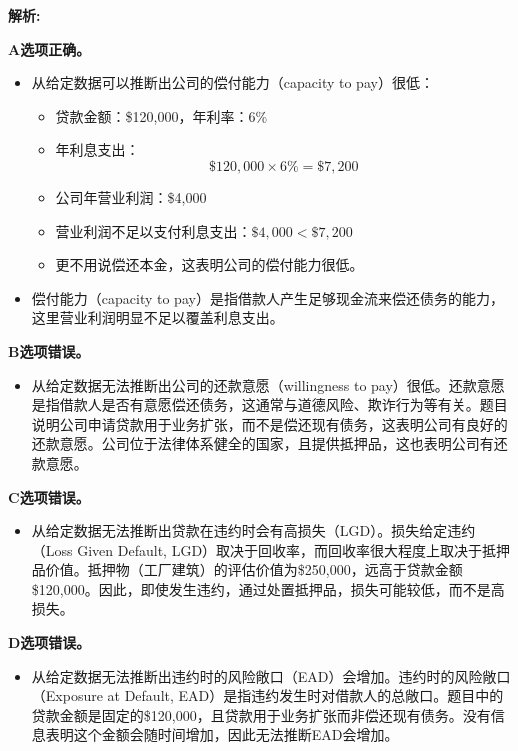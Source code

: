 \documentclass{article}
\newenvironment{explanation}
{\textbf{解析:}\par}
{\par}
\begin{document}
\begin{explanation}

    \textbf{A选项正确。}
    \begin{itemize}
        \item 从给定数据可以推断出公司的偿付能力（capacity to pay）很低：
        \begin{itemize}
            \item 贷款金额：\$120,000，年利率：6\%
            \item 年利息支出：
            \[
            \$120,000 \times 6\% = \$7,200
            \]
            \item 公司年营业利润：\$4,000
            \item 营业利润不足以支付利息支出：$\$4,000 < \$7,200$
            \item 更不用说偿还本金，这表明公司的偿付能力很低。
        \end{itemize}
        \item 偿付能力（capacity to pay）是指借款人产生足够现金流来偿还债务的能力，这里营业利润明显不足以覆盖利息支出。
    \end{itemize}

    \textbf{B选项错误。}
    \begin{itemize}
        \item 从给定数据无法推断出公司的还款意愿（willingness to pay）很低。还款意愿是指借款人是否有意愿偿还债务，这通常与道德风险、欺诈行为等有关。题目说明公司申请贷款用于业务扩张，而不是偿还现有债务，这表明公司有良好的还款意愿。公司位于法律体系健全的国家，且提供抵押品，这也表明公司有还款意愿。
    \end{itemize}

    \textbf{C选项错误。}
    \begin{itemize}
        \item 从给定数据无法推断出贷款在违约时会有高损失（LGD）。损失给定违约（Loss Given Default, LGD）取决于回收率，而回收率很大程度上取决于抵押品价值。抵押物（工厂建筑）的评估价值为\$250,000，远高于贷款金额\$120,000。因此，即使发生违约，通过处置抵押品，损失可能较低，而不是高损失。
    \end{itemize}

    \textbf{D选项错误。}
    \begin{itemize}
        \item 从给定数据无法推断出违约时的风险敞口（EAD）会增加。违约时的风险敞口（Exposure at Default, EAD）是指违约发生时对借款人的总敞口。题目中的贷款金额是固定的\$120,000，且贷款用于业务扩张而非偿还现有债务。没有信息表明这个金额会随时间增加，因此无法推断EAD会增加。
    \end{itemize}

\end{explanation}
\end{document}
